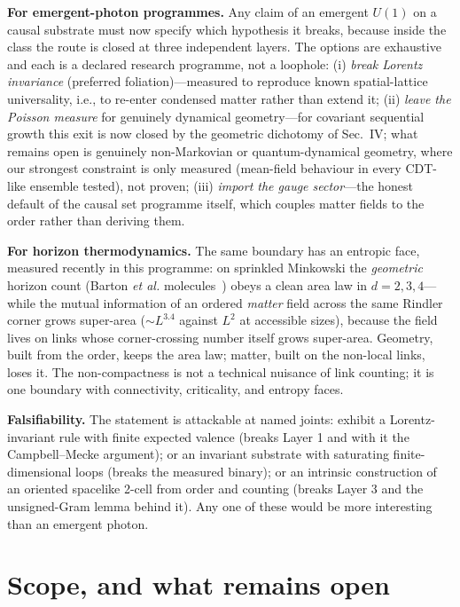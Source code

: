 \documentclass[aps,prd,reprint,nofootinbib,superscriptaddress,floatfix]{revtex4-2}
\begin{document}
\textbf{For emergent-photon programmes.} Any claim of an emergent $U(1)$ on a causal
substrate must now specify which hypothesis it breaks, because inside the class the
route is closed at three independent layers. The options are exhaustive and each is a
declared research programme, not a loophole: (i) \emph{break Lorentz invariance}
(preferred foliation)---measured to reproduce known spatial-lattice universality, i.e.,
to re-enter condensed matter rather than extend it; (ii) \emph{leave the Poisson
measure} for genuinely dynamical geometry---for covariant sequential growth this exit
is now closed by the geometric dichotomy of Sec.~IV; what remains open is genuinely
non-Markovian or quantum-dynamical geometry, where our strongest constraint is only
measured (mean-field behaviour in every CDT-like ensemble tested), not proven;
(iii) \emph{import the gauge sector}---the
honest default of the causal set programme itself, which couples matter fields to the
order rather than deriving them.

\textbf{For horizon thermodynamics.} The same boundary has an entropic face, measured
recently in this programme: on sprinkled Minkowski the \emph{geometric} horizon count
(Barton \emph{et al.} molecules~\cite{Barton2019,DouSorkin2003}) obeys a clean area law
in $d=2,3,4$---while the mutual information of an ordered \emph{matter} field across
the same Rindler corner grows super-area ($\sim L^{3.4}$ against $L^2$ at accessible
sizes), because the field lives on links whose corner-crossing number itself grows
super-area. Geometry, built from the order, keeps the area law; matter, built on the
non-local links, loses it. The non-compactness is not a technical nuisance of link
counting; it is one boundary with connectivity, criticality, and entropy faces.

\textbf{Falsifiability.} The statement is attackable at named joints: exhibit a
Lorentz-invariant rule with finite expected valence (breaks Layer 1 and with it the
Campbell--Mecke argument); or an invariant substrate with saturating
finite-dimensional loops (breaks the measured binary); or an intrinsic construction of
an oriented spacelike 2-cell from order and counting (breaks Layer 3 and the unsigned-Gram
lemma behind it). Any one of these would be more interesting than an emergent photon.

\section{Scope, and what remains open}
\end{document}
